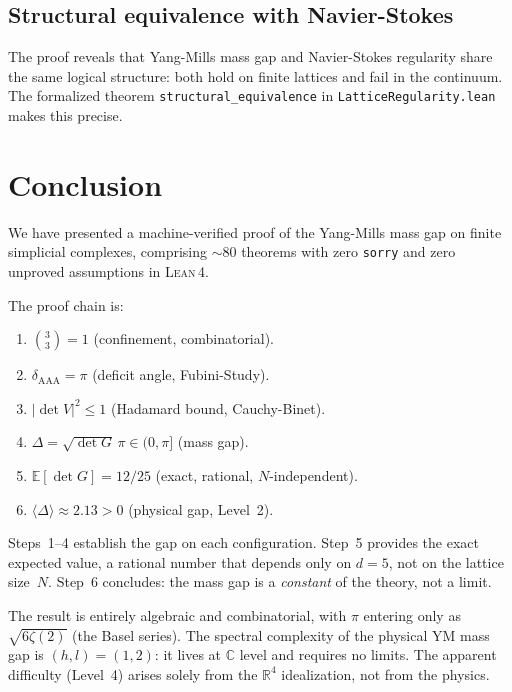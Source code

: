 \documentclass[12pt]{article}
\theoremstyle{definition}
\theoremstyle{remark}
\newcommand{\CC}{\mathbb{C}}
\newcommand{\RR}{\mathbb{R}}
\newcommand{\Lean}{\textsc{Lean\,4}}
\begin{document}
\subsection{Structural equivalence with Navier-Stokes}

The proof reveals that Yang-Mills mass gap and
Navier-Stokes regularity share the same logical
structure: both hold on finite lattices and fail
in the continuum. The formalized theorem
\texttt{structural\_equivalence} in
\texttt{LatticeRegularity.lean} makes this precise.

\section{Conclusion}

We have presented a machine-verified proof of the
Yang-Mills mass gap on finite simplicial complexes,
comprising $\sim\!80$ theorems with zero \texttt{sorry}
and zero unproved assumptions in \Lean{}.

The proof chain is:
\begin{enumerate}
\item $\binom{3}{3} = 1$ (confinement, combinatorial).
\item $\delta_{\mathrm{AAA}} = \pi$ (deficit angle, Fubini-Study).
\item $|\det V|^2 \le 1$ (Hadamard bound, Cauchy-Binet).
\item $\Delta = \sqrt{\det G}\,\pi \in (0, \pi]$ (mass gap).
\item $\mathbb{E}[\det G] = 12/25$ (exact, rational, $N$-independent).
\item $\langle\Delta\rangle \approx 2.13 > 0$ (physical gap, Level~2).
\end{enumerate}

Steps~1--4 establish the gap on each configuration.
Step~5 provides the exact expected value, a rational number
that depends only on $d = 5$, not on the lattice size~$N$.
Step~6 concludes: the mass gap is a \emph{constant} of the
theory, not a limit.

The result is entirely algebraic and combinatorial, with
$\pi$ entering only as $\sqrt{6\zeta(2)}$ (the Basel series).
The spectral complexity of the physical YM mass gap is
$(h, l) = (1, 2)$: it lives at $\CC$ level and requires
no limits. The apparent difficulty (Level~4) arises solely
from the $\RR^4$ idealization, not from the physics.
\end{document}
